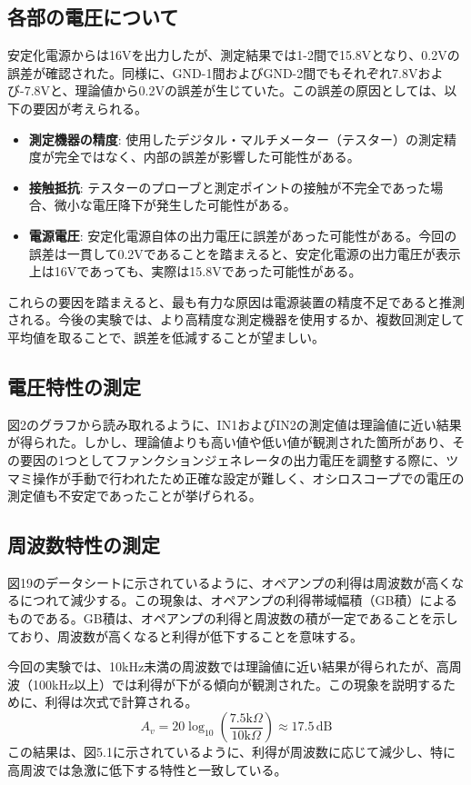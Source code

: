 \documentclass{jlreq}
\numberwithin{equation}{section}
\begin{document}
\subsection{各部の電圧について}
安定化電源からは16Vを出力したが、測定結果では1-2間で15.8Vとなり、0.2Vの誤差が確認された。同様に、GND-1間およびGND-2間でもそれぞれ7.8Vおよび-7.8Vと、理論値から0.2Vの誤差が生じていた。この誤差の原因としては、以下の要因が考えられる。

\begin{itemize}
  \item \textbf{測定機器の精度}: 使用したデジタル・マルチメーター（テスター）の測定精度が完全ではなく、内部の誤差が影響した可能性がある。
  \item \textbf{接触抵抗}: テスターのプローブと測定ポイントの接触が不完全であった場合、微小な電圧降下が発生した可能性がある。
  \item \textbf{電源電圧}: 安定化電源自体の出力電圧に誤差があった可能性がある。今回の誤差は一貫して0.2Vであることを踏まえると、安定化電源の出力電圧が表示上は16Vであっても、実際は15.8Vであった可能性がある。
\end{itemize}

これらの要因を踏まえると、最も有力な原因は電源装置の精度不足であると推測される。今後の実験では、より高精度な測定機器を使用するか、複数回測定して平均値を取ることで、誤差を低減することが望ましい。

\subsection{電圧特性の測定}
図2のグラフから読み取れるように、IN1およびIN2の測定値は理論値に近い結果が得られた。しかし、理論値よりも高い値や低い値が観測された箇所があり、その要因の1つとしてファンクションジェネレータの出力電圧を調整する際に、ツマミ操作が手動で行われたため正確な設定が難しく、オシロスコープでの電圧の測定値も不安定であったことが挙げられる。

\subsection{周波数特性の測定}
図19のデータシートに示されているように、オペアンプの利得は周波数が高くなるにつれて減少する。この現象は、オペアンプの利得帯域幅積（GB積）によるものである。GB積は、オペアンプの利得と周波数の積が一定であることを示しており、周波数が高くなると利得が低下することを意味する。

今回の実験では、10kHz未満の周波数では理論値に近い結果が得られたが、高周波（100kHz以上）では利得が下がる傾向が観測された。この現象を説明するために、利得は次式で計算される。
\begin{equation}
  A_v = 20 \log_{10} \left( \frac{7.5\text{k}\Omega}{10\text{k}\Omega} \right) \approx 17.5 \, \text{dB}
\end{equation}
この結果は、図5.1に示されているように、利得が周波数に応じて減少し、特に高周波では急激に低下する特性と一致している。
\end{document}
